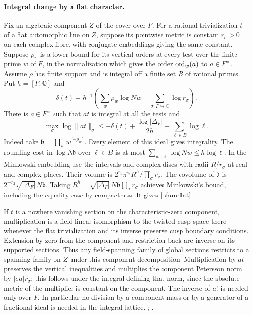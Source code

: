 \paragraph{Integral change by a flat character.}
Fix an algebraic component \(Z\) of the cover over \(F\).
For a rational trivialization \(t\) of a flat automorphic line on
\(Z\), suppose its pointwise metric is constant \(r_\sigma>0\)
on each complex fibre, with conjugate embeddings giving the same
constant. Suppose \(\rho_w\) is a lower bound for its vertical
orders at every test over the finite prime \(w\) of \(F\), in the
normalization which gives the order \({\rm ord}_w(a)\) to
\(a\in F^\times\). Assume \(\rho\) has finite support and is
integral off a finite set \(B\) of rational primes. Put \(h=[F:\mathbb Q]\)
and
\[
 \delta(t)=h^{-1}\left(\sum_w\rho_w\log Nw-
                         \sum_{\sigma:F\hookrightarrow\mathbb C}
                               \log r_\sigma\right).
\]
There is \(a\in F^\times\) such that \(at\) is integral at all
the tests and
\begin{equation}\label{bfam:flat}
 \max_\sigma\log\|at\|_\sigma
 \le-\delta(t)+\frac{\log|\Delta_F|}{2h}+\sum_{\ell\in B}\log\ell .
\end{equation}
Indeed take \(\mathfrak b=\prod_w w^{\lceil-\rho_w\rceil}\).
Every element of this ideal gives integrality. The rounding cost in
\(\log N\mathfrak b\) over \(\ell\in B\) is at most
\(\sum_{w\mid\ell}\log Nw\le h\log\ell\).
In the Minkowski embedding use the intervals and complex discs
with radii \(R/r_\sigma\) at real and complex places. Their volume
is \(2^{r_1}\pi^{r_2} R^h/\prod_\sigma r_\sigma\).
The covolume of \(\mathfrak b\) is
\(2^{-r_2}\sqrt{|\Delta_F|}\,N\mathfrak b\).
Taking \(R^h=\sqrt{|\Delta_F|}\,N\mathfrak b\prod_\sigma r_\sigma\)
achieves Minkowski's bound, including the equality case by compactness.
It gives \eqref{bfam:flat}.

If \(t\) is a nowhere vanishing section on the characteristic-zero
component, multiplication is a field-linear isomorphism to the
twisted cusp space there whenever the flat trivialization and
its inverse preserve cusp boundary conditions. Extension by zero
from the component and restriction back are inverse on its supported
sections. Thus any field-spanning family of global sections restricts
to a spanning family on \(Z\) under this component decomposition.
Multiplication by \(at\) preserves the vertical inequalities and
multiplies the component Petersson norm by \(|\sigma a|r_\sigma\):
this follows under the integral defining that norm, since the
absolute metric of the multiplier is constant on the component.
The inverse of \(at\) is needed only over \(F\). In particular no
division by a component mass or by a generator of a fractional
ideal is needed in the integral lattice.
;
.

